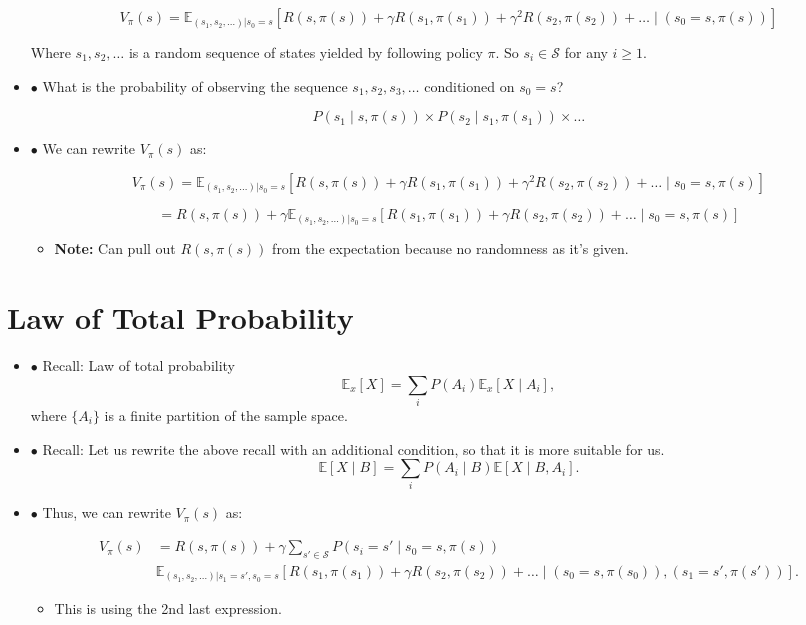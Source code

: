\begin{derivation}
\begin{itemize}
    \[
    V_\pi(s) = \mathbb{E}_{(s_1, s_2, \dots) | s_0=s} \left[ R(s, \pi(s)) + \gamma R(s_1, \pi(s_1)) + \gamma^2 R(s_2, \pi(s_2)) + \dots \mid (s_0 = s, \pi(s)) \right]
    \]

    Where $s_1, s_2, \dots$ is a random sequence of states yielded by following policy $\pi$. So $s_i \in \mathcal{S}$ for any $i \geq 1$.

    \item $\bullet$ What is the probability of observing the sequence $s_1, s_2, s_3, \dots$ conditioned on $s_0 = s$?

    \[
    P(s_1 \mid s, \pi(s)) \times P(s_2 \mid s_1, \pi(s_1)) \times \dots
    \]

    \item $\bullet$ We can rewrite $V_\pi(s)$ as:

    \[
    V_\pi(s) = \mathbb{E}_{(s_1, s_2, \dots) | s_0=s} \left[ R(s, \pi(s)) + \gamma R(s_1, \pi(s_1)) + \gamma^2 R(s_2, \pi(s_2)) + \dots \mid s_0 = s, \pi(s) \right]
    \]

    \[
    = R(s, \pi(s)) + \gamma \mathbb{E}_{(s_1, s_2, \dots)| s_0=s} \left[ R(s_1, \pi(s_1)) + \gamma R(s_2, \pi(s_2)) + \dots \mid s_0 = s, \pi(s) \right]
    \]
    \begin{itemize}
        \item \textbf{Note:} Can pull out $R(s, \pi(s))$ from the expectation because no randomness as it's given. 
    \end{itemize}
\end{itemize}

\section*{Law of Total Probability}
\begin{itemize}
    \item $\bullet$ Recall: Law of total probability
    \[
    \mathbb{E}_x[X] = \sum_i P(A_i) \mathbb{E}_x[X \mid A_i],
    \]
    where $\{A_i\}$ is a finite partition of the sample space.

    \item $\bullet$ Recall: Let us rewrite the above recall with an additional condition, so that it is more suitable for us.
    \[
    \mathbb{E}[X \mid B] = \sum_i P(A_i \mid B) \mathbb{E}[X \mid B, A_i].
    \]

    \item $\bullet$ Thus, we can rewrite $V_\pi(s)$ as:

    \begin{align*}
        V_\pi(s) &= R(s, \pi(s)) + \gamma \sum_{s' \in \mathcal{S}} P(s_i = s' \mid s_0 = s, \pi(s)) \\
        &\mathbb{E}_{(s_1, s_2, \dots)| s_1=s',s_0=s} \left[ R(s_1, \pi(s_1)) + \gamma R(s_2, \pi(s_2)) + \dots \mid (s_0 = s, \pi(s_0)),(s_1=s',\pi(s')) \right].
    \end{align*}
    \begin{itemize}
        \item This is using the 2nd last expression. 
    \end{itemize}
\end{itemize}


\end{derivation}

